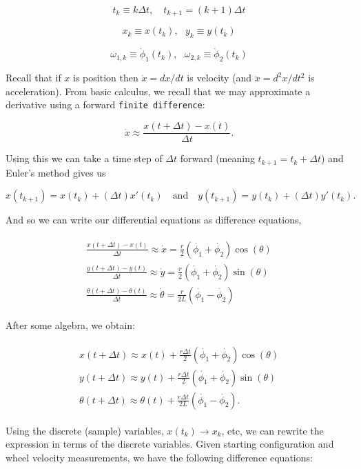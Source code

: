 \[t_k \equiv k\Delta t, \quad t_{k+1} = (k+1)\Delta t\]

\[x_k \equiv x(t_k), ~~~ y_k \equiv y(t_k)\]

\[\omega_{1, k}\equiv \dot{\phi}_{1}(t_k), ~~~
\omega_{2, k}\equiv \dot{\phi}_{2}(t_k)\]

Recall that if \(x\) is position then \(\dot{x}=dx/dt\) is velocity (and
\(\ddot{x}=d^2x/dt^2\) is acceleration). From basic calculus, we recall
that we may approximate a derivative using a forward
\texttt{finite\ difference}:

\[\dot{x} \approx \frac{x(t+\Delta t) - x(t)}{\Delta t}.\]

Using this we can take a time step of \(\Delta t\) forward (meaning
\(t_{k+1} = t_k + \Delta t\)) and Euler's method gives us

\[x(t_{k+1}) = x(t_k) + (\Delta t)x'(t_k) \quad \mbox{and}
\quad y(t_{k+1}) = y(t_k) + (\Delta t)y'(t_k).\]

And so we can write our differential equations as difference equations,

\[\begin{aligned}
\begin{array}{l}
\displaystyle \frac{x(t+\Delta t) - x(t)}{\Delta t}\approx \dot{x} = \frac{r}{2} (\dot{\phi_1}+\dot{\phi_2})\cos(\theta) \\[5mm]
\displaystyle \frac{y(t+\Delta t) - y(t)}{\Delta t}\approx \dot{y} = \frac{r}{2} (\dot{\phi_1}+\dot{\phi_2})\sin(\theta) \\[5mm]
\displaystyle \frac{\theta (t+\Delta t) - \theta (t)}{\Delta t}\approx \dot{\theta} = \frac{r}{2L} (\dot{\phi_1}-\dot{\phi_2})
\end{array}
\end{aligned}\]

After some algebra, we obtain:

\[\begin{aligned}
\begin{array}{l}
 x(t+\Delta t) \approx x(t) +\frac{r\Delta t}{2} (\dot{\phi_1}+\dot{\phi_2})\cos(\theta) \\[5mm]
 y(t+\Delta t) \approx y(t) +\frac{r\Delta t}{2} (\dot{\phi_1}+\dot{\phi_2})\sin(\theta) \\[5mm]
\theta (t+\Delta t) \approx \theta (t) +\frac{r\Delta t}{2L} (\dot{\phi_1}-\dot{\phi_2}).
\end{array}
\end{aligned}\]

Using the discrete (sample) variables, \(x(t_k) \to x_k\), etc, we can
rewrite the expression in terms of the discrete variables. Given
starting configuration and wheel velocity measurements, we have the
following difference equations:

